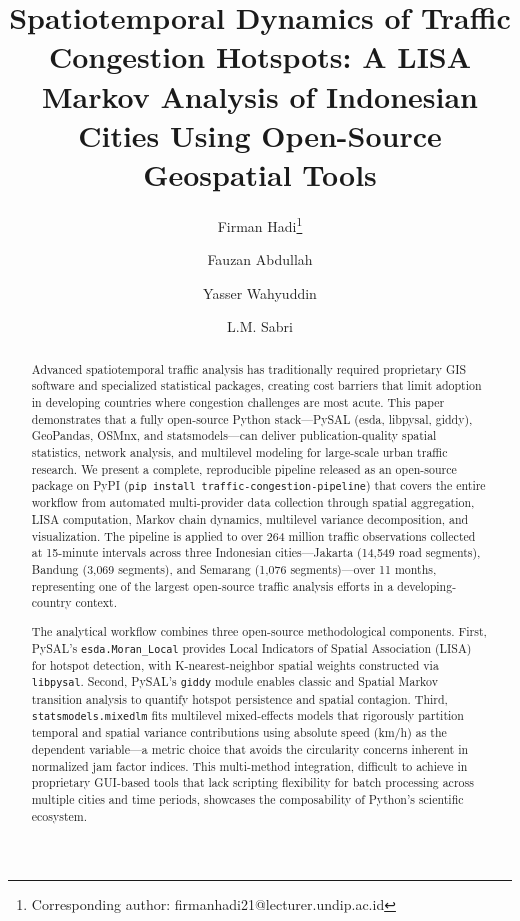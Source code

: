 \documentclass[11pt,a4paper]{article}
\title{\textbf{Spatiotemporal Dynamics of Traffic Congestion Hotspots: A LISA Markov Analysis of Indonesian Cities Using Open-Source Geospatial Tools}}
\author[1]{Firman Hadi\thanks{Corresponding author: firmanhadi21@lecturer.undip.ac.id}}
\author[2]{Fauzan Abdullah}
\author[1]{Yasser Wahyuddin}
\author[1]{L.M. Sabri}
\affil[1]{Department of Geodetic Engineering, Universitas Diponegoro, Semarang, Indonesia}
\affil[2]{Department of Statistics, Faculty of Sciences and Mathematics, Universitas Diponegoro, Semarang, Indonesia}
\date{}
\begin{document}
\maketitle

\begin{abstract}
Advanced spatiotemporal traffic analysis has traditionally required proprietary GIS software and specialized statistical packages, creating cost barriers that limit adoption in developing countries where congestion challenges are most acute. This paper demonstrates that a fully open-source Python stack---PySAL (esda, libpysal, giddy), GeoPandas, OSMnx, and statsmodels---can deliver publication-quality spatial statistics, network analysis, and multilevel modeling for large-scale urban traffic research. We present a complete, reproducible pipeline released as an open-source package on PyPI (\texttt{pip install traffic-congestion-pipeline}) that covers the entire workflow from automated multi-provider data collection through spatial aggregation, LISA computation, Markov chain dynamics, multilevel variance decomposition, and visualization. The pipeline is applied to over 264 million traffic observations collected at 15-minute intervals across three Indonesian cities---Jakarta (14,549 road segments), Bandung (3,069 segments), and Semarang (1,076 segments)---over 11 months, representing one of the largest open-source traffic analysis efforts in a developing-country context.

The analytical workflow combines three open-source methodological components. First, PySAL's \texttt{esda.Moran\_Local} provides Local Indicators of Spatial Association (LISA) for hotspot detection, with K-nearest-neighbor spatial weights constructed via \texttt{libpysal}. Second, PySAL's \texttt{giddy} module enables classic and Spatial Markov transition analysis to quantify hotspot persistence and spatial contagion. Third, \texttt{statsmodels.mixedlm} fits multilevel mixed-effects models that rigorously partition temporal and spatial variance contributions using absolute speed (km/h) as the dependent variable---a metric choice that avoids the circularity concerns inherent in normalized jam factor indices. This multi-method integration, difficult to achieve in proprietary GUI-based tools that lack scripting flexibility for batch processing across multiple cities and time periods, showcases the composability of Python's scientific ecosystem.


\end{abstract}
\end{document}
